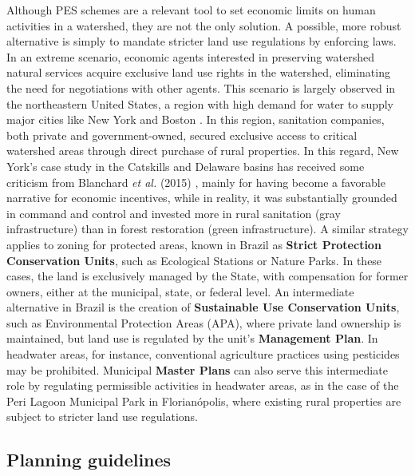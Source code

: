 \documentclass[./main_en.tex]{subfiles}
\begin{document}
\par Although PES schemes are a relevant tool to set economic limits on human activities in a watershed, they are not the only solution. A possible, more robust alternative is simply to mandate stricter land use regulations by enforcing laws. In an extreme scenario, economic agents interested in preserving watershed natural services acquire exclusive land use rights in the watershed, eliminating the need for negotiations with other agents. This scenario is largely observed in the northeastern United States, a region with high demand for water to supply major cities like New York and Boston \cite{alcott2013}. In this region, sanitation companies, both private and government-owned, secured exclusive access to critical watershed areas through direct purchase of rural properties. In this regard, New York’s case study in the Catskills and Delaware basins has received some criticism from Blanchard \textit{et al.} (2015) \cite{Blanchard2015a}, mainly for having become a favorable narrative for economic incentives, while in reality, it was substantially grounded in command and control and invested more in rural sanitation (gray infrastructure) than in forest restoration (green infrastructure). A similar strategy applies to zoning for protected areas, known in Brazil as \textbf{Strict Protection Conservation Units}, such as Ecological Stations or Nature Parks. In these cases, the land is exclusively managed by the State, with compensation for former owners, either at the municipal, state, or federal level. An intermediate alternative in Brazil is the creation of \textbf{Sustainable Use Conservation Units}, such as Environmental Protection Areas (APA), where private land ownership is maintained, but land use is regulated by the unit’s \textbf{Management Plan}. In headwater areas, for instance, conventional agriculture practices using pesticides may be prohibited. Municipal \textbf{Master Plans} can also serve this intermediate role by regulating permissible activities in headwater areas, as in the case of the Peri Lagoon Municipal Park in Florianópolis, where existing rural properties are subject to stricter land use regulations.

\subsection{Planning guidelines}
\end{document}
